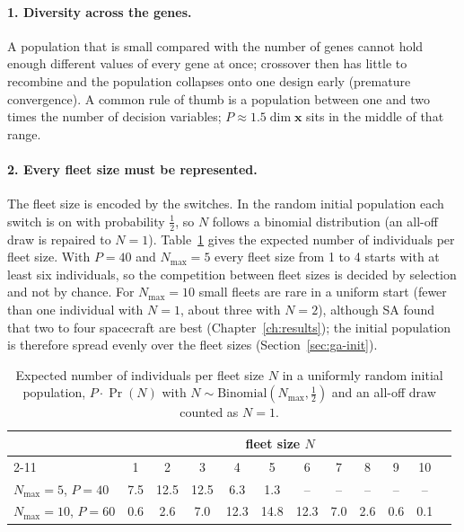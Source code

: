 \paragraph{1. Diversity across the genes.} A population that is small compared with the number
of genes cannot hold enough different values of every gene at once; crossover then has little to
recombine and the population collapses onto one design early (premature convergence). A common
rule of thumb is a population between one and two times the number of decision variables;
$P\approx1.5\dim\mathbf{x}$ sits in the middle of that range.

\paragraph{2. Every fleet size must be represented.} The fleet size is encoded by the switches.
In the random initial population each switch is on with probability $\tfrac12$, so $N$ follows a
binomial distribution (an all-off draw is repaired to $N=1$). Table~\ref{tab:popN} gives the
expected number of individuals per fleet size. With $P=40$ and $N_{\max}=5$ every fleet size from
1 to 4 starts with at least six individuals, so the competition between fleet sizes is decided by
selection and not by chance. For $N_{\max}=10$ small fleets are rare in a uniform start
(fewer than one individual with $N=1$, about three with $N=2$), although \ac{SA} found that two to
four spacecraft are best (Chapter~\ref{ch:results}); the initial population is therefore
spread evenly over the fleet sizes (Section~\ref{sec:ga-init}).

\begin{table}[htbp]
\centering
\caption{Expected number of individuals per fleet size $N$ in a uniformly random initial
population, $P\cdot\Pr(N)$ with $N\sim\mathrm{Binomial}(N_{\max},\tfrac12)$ and an all-off draw
counted as $N=1$.}
\label{tab:popN}
\footnotesize
\begin{tabular}{@{}lccccccccccc@{}}
\toprule
 & \multicolumn{10}{c}{fleet size $N$} \\
\cmidrule(l){2-11}
 & 1 & 2 & 3 & 4 & 5 & 6 & 7 & 8 & 9 & 10 \\
\midrule
$N_{\max}=5$, $P=40$  & 7.5 & 12.5 & 12.5 & 6.3 & 1.3 & -- & -- & -- & -- & -- \\
$N_{\max}=10$, $P=60$ & 0.6 & 2.6 & 7.0 & 12.3 & 14.8 & 12.3 & 7.0 & 2.6 & 0.6 & 0.1 \\
\bottomrule
\end{tabular}
\end{table}

